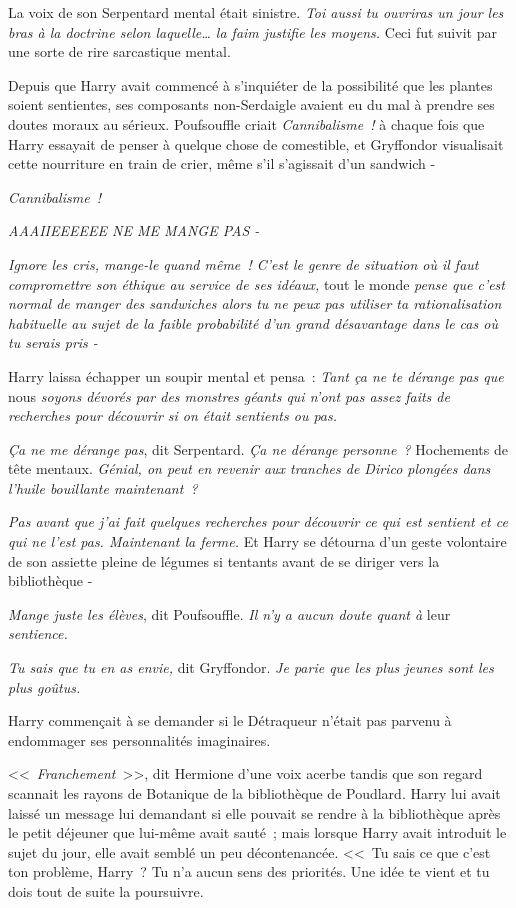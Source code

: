 La voix de son Serpentard mental était sinistre. \emph{Toi aussi tu ouvriras un jour les bras à la doctrine selon laquelle… la faim justifie les moyens.} Ceci fut suivit par une sorte de rire sarcastique mental.

Depuis que Harry avait commencé à s'inquiéter de la possibilité que les plantes soient sentientes, ses composants non-Serdaigle avaient eu du mal à prendre ses doutes moraux au sérieux. Poufsouffle criait \emph{Cannibalisme~!} à chaque fois que Harry essayait de penser à quelque chose de comestible, et Gryffondor visualisait cette nourriture en train de crier, même s'il s'agissait d'un sandwich -

\emph{Cannibalisme~!}

\emph{AAAIIEEEEEE NE ME MANGE PAS -}

\emph{Ignore les cris, mange-le quand même~! C'est le genre de situation où il faut compromettre son éthique au service de ses idéaux,} tout le monde \emph{pense que c'est normal de manger des sandwiches alors tu ne peux pas utiliser ta rationalisation habituelle au sujet de la faible probabilité d'un grand désavantage dans le cas où tu serais pris -}

Harry laissa échapper un soupir mental et pensa~: \emph{Tant ça ne te dérange pas que} nous \emph{soyons dévorés par des monstres géants qui n'ont pas assez faits de recherches pour découvrir si on était sentients ou pas.}

\emph{Ça ne me dérange pas}, dit Serpentard. \emph{Ça ne dérange personne~?} Hochements de tête mentaux. \emph{Génial, on peut en revenir aux tranches de Dirico plongées dans l'huile bouillante maintenant~?}

\emph{Pas avant que j'ai fait quelques recherches pour découvrir ce qui est sentient et ce qui ne l'est pas. Maintenant la ferme.} Et Harry se détourna d'un geste volontaire de son assiette pleine de légumes si tentants avant de se diriger vers la bibliothèque -

\emph{Mange juste les élèves}, dit Poufsouffle. \emph{Il n'y a aucun doute quant à} leur \emph{sentience.}

\emph{Tu sais que tu en as envie,} dit Gryffondor. \emph{Je parie que les plus jeunes sont les plus goûtus.}

Harry commençait à se demander si le Détraqueur n'était pas parvenu à endommager ses personnalités imaginaires.

\later

<<~\emph{Franchement}~>>, dit Hermione d'une voix acerbe tandis que son regard scannait les rayons de Botanique de la bibliothèque de Poudlard. Harry lui avait laissé un message lui demandant si elle pouvait se rendre à la bibliothèque après le petit déjeuner que lui-même avait sauté~; mais lorsque Harry avait introduit le sujet du jour, elle avait semblé un peu décontenancée. <<~Tu sais ce que c'est ton problème, Harry~? Tu n'a aucun sens des priorités. Une idée te vient et tu dois tout de suite la poursuivre.

